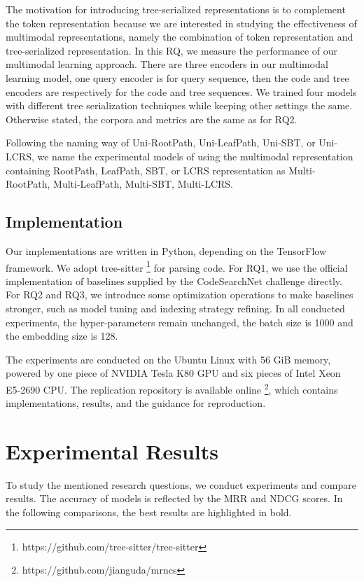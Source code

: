\documentclass[conference]{IEEEtran}
\begin{document}
\emph{\rqccc}

The motivation for introducing tree-serialized representations is to complement the token representation because we are interested in studying the effectiveness of multimodal representations, namely the combination of token representation and tree-serialized representation. In this RQ, we measure the performance of our multimodal learning approach. There are three encoders in our multimodal learning model, one query encoder is for query sequence, then the code and tree encoders are respectively for the code and tree sequences. We trained four models with different tree serialization techniques while keeping other settings the same. Otherwise stated, the corpora and metrics are the same as for RQ2.

Following the naming way of Uni-RootPath, Uni-LeafPath, Uni-SBT, or Uni-LCRS, we name the experimental models of using the multimodal representation containing RootPath, LeafPath, SBT, or LCRS representation as Multi-RootPath, Multi-LeafPath, Multi-SBT, Multi-LCRS.

\subsection{Implementation}

Our implementations are written in Python, depending on the TensorFlow \cite{Abadi2016TensorFlowAS} framework. We adopt tree-sitter \footnote{https://github.com/tree-sitter/tree-sitter} for parsing code. For RQ1, we use the official implementation of baselines supplied by the CodeSearchNet challenge directly. For RQ2 and RQ3, we introduce some optimization operations to make baselines stronger, such as model tuning and indexing strategy refining. In all conducted experiments, the hyper-parameters remain unchanged, the batch size is 1000 and the embedding size is 128.

The experiments are conducted on the Ubuntu Linux with 56 GiB memory, powered by one piece of NVIDIA Tesla K80 GPU and six pieces of Intel Xeon E5-2690 CPU. The replication repository is available online \footnote{https://github.com/jianguda/mrncs}, which contains implementations, results, and the guidance for reproduction.
 \section{Experimental Results}
\label{sec:results}

To study the mentioned research questions, we conduct experiments and compare results. The accuracy of models is reflected by the MRR and NDCG scores. In the following comparisons, the best results are highlighted in bold.
\end{document}
